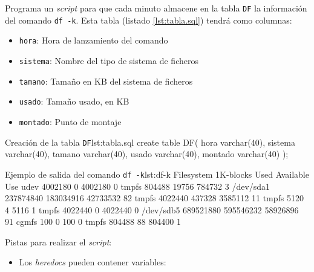 \begin{homeworkProblem}


  Programa un \textit{script} para que cada minuto almacene en la tabla \texttt{DF} la información del comando \texttt{df -k}. Esta tabla (listado \ref{lst:tabla.sql}) tendrá como columnas:
  \begin{itemize}
  \item \texttt{hora}: Hora de lanzamiento del comando
  \item \texttt{sistema}: Nombre del tipo de sistema de ficheros
  \item \texttt{tamano}: Tamaño en KB del sistema de ficheros
  \item \texttt{usado}: Tamaño usado, en KB
  \item \texttt{montado}: Punto de montaje
  \end{itemize}

  \begin{listadoshell}{Creación de la tabla \texttt{DF}}{lst:tabla.sql}
  create table DF(
    hora varchar(40),
    sistema varchar(40),
    tamano varchar(40),
    usado varchar(40),
    montado varchar(40)
  );
  \end{listadoshell}



  \begin{listadotxt}{Ejemplo de salida del comando \texttt{df -k}}{lst:df-k}
Filesystem     1K-blocks      Used Available Use%
udev             4002180         0   4002180   0%
tmpfs             804488     19756    784732   3%
/dev/sda1      237874840 183034916  42733532  82%
tmpfs            4022440    437328   3585112  11%
tmpfs               5120         4      5116   1%
tmpfs            4022440         0   4022440   0%
/dev/sdb5      689521880 595546232  58926896  91%
cgmfs                100         0       100   0%
tmpfs             804488        88    804400   1%
  \end{listadotxt}
  

  Pistas para realizar el \textit{script}:
  \begin{itemize}
    
  \item Los \textit{heredocs} pueden contener variables: 
    

\end{itemize}
\end{homeworkProblem}
